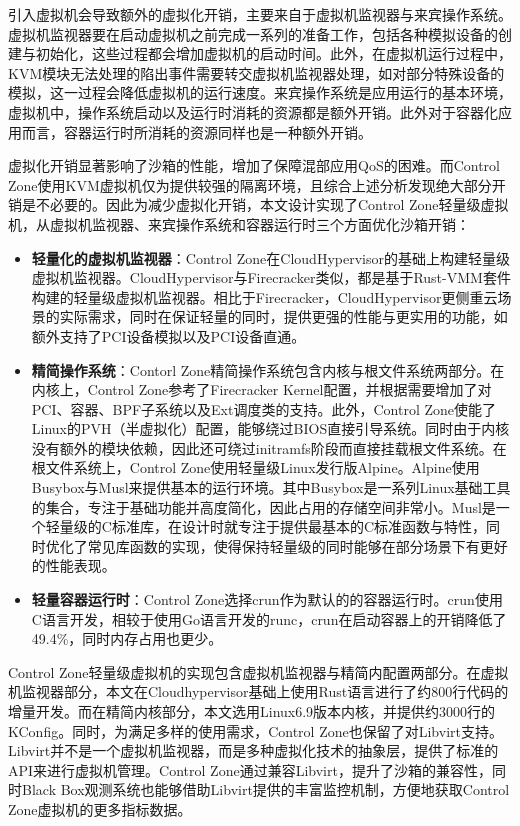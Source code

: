 引入虚拟机会导致额外的虚拟化开销，主要来自于虚拟机监视器与来宾操作系统。虚拟机监视器要在启动虚拟机之前完成一系列的准备工作，包括各种模拟设备的创建与初始化，这些过程都会增加虚拟机的启动时间。此外，在虚拟机运行过程中，KVM模块无法处理的陷出事件需要转交虚拟机监视器处理，如对部分特殊设备的模拟，这一过程会降低虚拟机的运行速度。来宾操作系统是应用运行的基本环境，虚拟机中，操作系统启动以及运行时消耗的资源都是额外开销。此外对于容器化应用而言，容器运行时所消耗的资源同样也是一种额外开销。

虚拟化开销显著影响了沙箱的性能，增加了保障混部应用QoS的困难。而Control Zone使用KVM虚拟机仅为提供较强的隔离环境，且综合上述分析发现绝大部分开销是不必要的。因此为减少虚拟化开销，本文设计实现了Control Zone轻量级虚拟机，从虚拟机监视器、来宾操作系统和容器运行时三个方面优化沙箱开销：

\begin{itemize}

    \item \textbf{轻量化的虚拟机监视器}：Control Zone在CloudHypervisor的基础上构建轻量级虚拟机监视器。CloudHypervisor与Firecracker类似，都是基于Rust-VMM套件构建的轻量级虚拟机监视器。相比于Firecracker，CloudHypervisor更侧重云场景的实际需求\citep{agache2020firecracker}，同时在保证轻量的同时，提供更强的性能与更实用的功能，如额外支持了PCI设备模拟以及PCI设备直通。

    \item \textbf{精简操作系统}：Contorl Zone精简操作系统包含内核与根文件系统两部分。在内核上，Control Zone参考了Firecracker Kernel配置，并根据需要增加了对PCI、容器、BPF子系统以及Ext调度类的支持。此外，Control Zone使能了Linux的PVH（半虚拟化）配置，能够绕过BIOS直接引导系统。同时由于内核没有额外的模块依赖，因此还可绕过initramfs阶段而直接挂载根文件系统。在根文件系统上，Control Zone使用轻量级Linux发行版Alpine\citep{alpine}。Alpine使用Busybox与Musl来提供基本的运行环境。其中Busybox是一系列Linux基础工具的集合，专注于基础功能并高度简化，因此占用的存储空间非常小。Musl是一个轻量级的C标准库，在设计时就专注于提供最基本的C标准函数与特性，同时优化了常见库函数的实现，使得保持轻量级的同时能够在部分场景下有更好的性能表现。

    \item \textbf{轻量容器运行时}：Control Zone选择crun\citep{crun}作为默认的的容器运行时。crun使用C语言开发，相较于使用Go语言开发的runc，crun在启动容器上的开销降低了49.4\%，同时内存占用也更少。

\end{itemize}

Control Zone轻量级虚拟机的实现包含虚拟机监视器与精简内配置两部分。在虚拟机监视器部分，本文在Cloudhypervisor基础上使用Rust语言进行了约800行代码的增量开发。而在精简内核部分，本文选用Linux6.9版本内核，并提供约3000行的KConfig。同时，为满足多样的使用需求，Control Zone也保留了对Libvirt支持。Libvirt并不是一个虚拟机监视器，而是多种虚拟化技术的抽象层，提供了标准的API来进行虚拟机管理。Control Zone通过兼容Libvirt，提升了沙箱的兼容性，同时Black Box观测系统也能够借助Libvirt提供的丰富监控机制，方便地获取Control Zone虚拟机的更多指标数据。

